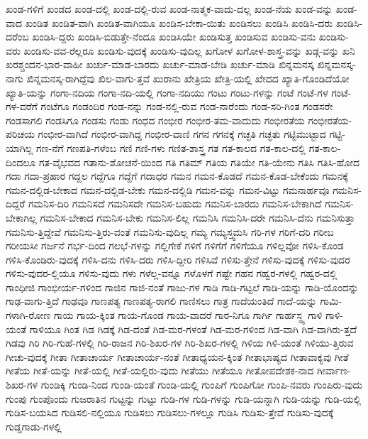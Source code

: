 {ಖಂಡ-ಗಳಿಗೆ
ಖಂಡದ
ಖಂಡ-ದಲ್ಲಿ
ಖಂಡ-ದಲ್ಲಿ-ರುವ
ಖಂಡ-ನಾತ್ಮಕ-ವಾದು-ದಲ್ಲ
ಖಂಡ-ನೆಯ
ಖಂಡ-ವನ್ನು
ಖಂಡ-ವಾದ
ಖಂಡಿತ
ಖಂಡಿತ-ವಾಗಿ
ಖಂಡಿತ-ವಾಗಿಯೂ
ಖಂಡಿಸ-ಬೇಕಾ-ಯಿತು
ಖಂಡಿಸಲು
ಖಂಡಿಸಿ
ಖಂಡಿಸಿ-ದರು
ಖಂಡಿಸಿ-ದರೆಂಬ
ಖಂಡಿಸಿ-ದ್ದರು
ಖಂಡಿಸಿ-ಬಿಡುತ್ತೇ-ನೆಂದೂ
ಖಂಡಿಸಿಯೇ
ಖಂಡಿಸುತ್ತ
ಖಂಡಿಸುವ
ಖಂಡಿಸು-ವನು
ಖಂಡಿಸು-ವರು
ಖಂಡಿಸು-ವವ-ರೆಲ್ಲರೂ
ಖಂಡಿಸು-ವುದಕ್ಕೆ
ಖಂಡಿಸು-ವುದಿಲ್ಲ
ಖಗೋಳ
ಖಗೋಳ-ಶಾಸ್ತ್ರ-ವನ್ನು
ಖಡ್ಗ-ವನ್ನು
ಖನಿ
ಖರಶ್ಚಂದನ-ಭಾರ-ವಾಹೀ
ಖರ್ಚು-ಮಾಡ-ಬಾರದು
ಖರ್ಚು-ಮಾಡ-ಬೇಡಿ
ಖರ್ಚು-ಮಾಡಿ
ಖಿನ್ನಮನಸ್ಕ
ಖಿನ್ನಮನಸ್ಕ-ನಾಗು
ಖಿನ್ನಮನಸ್ಕ-ರಾಗಿದ್ದೆವು
ಖಿಲ-ವಾಗು-ತ್ತವೆ
ಖುರಾನು
ಖೇತ್ರಿಯ
ಖೇತ್ರಿ-ಯಲ್ಲಿ
ಖೇದದ
ಖ್ಯಾತಿ-ಗೊಂಡಿದೆಯೋ
ಖ್ಯಾತಿ-ಯನ್ನು
ಗಂಗಾ-ನದಿಯ
ಗಂಗಾ-ನದಿ-ಯಲ್ಲಿ
ಗಂಗಾ-ನದಿಯು
ಗಂಟು
ಗಂಟು-ಗಳನ್ನು
ಗಂಟೆ
ಗಂಟೆ-ಗಳ
ಗಂಟೆ-ಗಳ-ವರೆಗೆ
ಗಂಟೆಗೂ
ಗಂಡಂದಿರ
ಗಂಡ-ನನ್ನು
ಗಂಡ-ನಲ್ಲಿ-ರುವ
ಗಂಡ-ನಾರೆಂದು
ಗಂಡ-ಸರಿ-ಗಿಂತ
ಗಂಡಸರೇ
ಗಂಡಸಾಗಲಿ
ಗಂಡಸಿಗೂ
ಗಂಡಸು
ಗಂಡು
ಗಂಧದ
ಗಂಭೀರ
ಗಂಭೀರ-ತಮ-ವಾದುದು
ಗಂಭೀರತೆಯ
ಗಂಭೀರತೆಯ-ಪರಿಚಯ
ಗಂಭೀರ-ವಾಗಿದೆ
ಗಂಭೀರ-ವಾಗಿದ್ದ
ಗಂಭೀರ-ವಾಣಿ
ಗಗನ
ಗಗನಕ್ಕೆ
ಗಚ್ಛತಿ
ಗಚ್ಛತು
ಗಟ್ಟಿಮುಟ್ಟಾದ
ಗಟ್ಟಿ-ಯಾಗಿಲ್ಲ
ಗಣ-ನೆಗೆ
ಗಣಪತಿ-ಗಳೆಂಬ
ಗಣಿ
ಗಣಿ-ಗಳು
ಗಣಿತ-ಶಾಸ್ತ್ರ
ಗತ
ಗತ-ಕಾಲದ
ಗತ-ಕಾಲ-ದಲ್ಲಿ
ಗತ-ಕಾಲ-ದಿಂದಲೂ
ಗತ-ವೈಭವದ
ಗತಾನು-ಶೋಚನೆ-ಯಿಂದ
ಗತಿ
ಗತಿಮ್
ಗತಿಯ
ಗತಿಯೇ
ಗತಿ-ಯೇನು
ಗತಿಸಿ
ಗತಿಸಿ-ಹೋದ
ಗದಾ
ಗದಾ-ಪ್ರಹಾರ
ಗದ್ದಲ
ಗದ್ದೆಗೂ
ಗದ್ದೆಗೆ
ಗದಾಧರ
ಗಮನ
ಗಮನ-ಕೊಡದೆ
ಗಮನ-ಕೊಡ-ಬೇಕೆಂದು
ಗಮನಕ್ಕೆ
ಗಮನ-ದಲ್ಲಿಡ-ಬೇಕಾದ
ಗಮನ-ದಲ್ಲಿಡ-ಬೇಕು
ಗಮನ-ದಲ್ಲಿಡಿ
ಗಮನ-ವನ್ನು
ಗಮನ-ವಿಟ್ಟು
ಗಮನಾರ್ಹವೂ
ಗಮನಿಸ-ದಿದ್ದರೆ
ಗಮನಿಸ-ದಿರಿ
ಗಮನಿಸದೆ
ಗಮನಿಸದೇ
ಗಮನಿಸ-ಬಹುದು
ಗಮನಿಸ-ಬಾರದು
ಗಮನಿಸ-ಬೇಕಾಗಿದೆ
ಗಮನಿಸ-ಬೇಕಾಗಿಲ್ಲ
ಗಮನಿಸ-ಬೇಕಾದ
ಗಮನಿಸ-ಬೇಕು
ಗಮನಿಸ-ಲಿಲ್ಲ
ಗಮನಿಸಿ
ಗಮನಿಸಿ-ದರೇ
ಗಮನಿಸಿ-ದೆನು
ಗಮನಿಸುತ್ತಾ
ಗಮನಿಸು-ತ್ತಿದ್ದೇವೆ
ಗಮನಿಸು-ತ್ತಿರು-ವಂತೆ
ಗಮನಿಸು-ವುದಿಲ್ಲ
ಗಮ್ಯ
ಗಮ್ಯಸ್ತ್ವಮಸಿ
ಗರಿ-ಗಳ
ಗರಿಗೆ-ದರಿ
ಗರೀಬ
ಗರೀಯಸೀ
ಗರ್ಜನೆ
ಗರ್ಭ-ದಿಂದ
ಗಲಭೆ-ಗಳನ್ನು
ಗಲ್ಲಿಗೇಕೆ
ಗಳಿಗೆ
ಗಳಿಗೆಗೆ
ಗಳಿಗೆಯೂ
ಗಳಿಲ್ಲವೋ
ಗಳಿಸಿ-ಕೊಂಡ
ಗಳಿಸಿ-ಕೊಂಡಿರು-ವುದಕ್ಕೆ
ಗಳಿಸಿ-ದನು
ಗಳಿಸಿ-ದರು
ಗಳಿಸಿ-ದ್ದೀರಿ
ಗಳಿಸಿವೆ
ಗಳಿಸು-ತ್ತೇನೆ
ಗಳಿಸು-ವುದಕ್ಕೆ
ಗಳಿಸು-ವುದರ
ಗಳಿಸು-ವುದರ-ಲ್ಲಿಯೂ
ಗಳಿಸು-ವುದು
ಗಳು
ಗಳೆಲ್ಲ-ವನ್ನೂ
ಗಳೊಳಗೆ
ಗಷ್ಟೇ
ಗಹನ
ಗಹ್ವರ-ಗಳಲ್ಲಿ
ಗಹ್ವರ-ದಲ್ಲಿ
ಗಾಂಧೀಜಿ
ಗಾಂಭೀರ್ಯ-ಗಳಿಂದ
ಗಾಜಿನ
ಗಾಜಿ-ನಂತೆ
ಗಾಜು-ಗಳ
ಗಾಡಿ
ಗಾಡಿ-ಗಟ್ಟಲೆ
ಗಾಡಿ-ಯನ್ನು
ಗಾಡಿ-ಯೊಂದನ್ನು
ಗಾಢ-ವಾಗು-ತ್ತಿದೆ
ಗಾಢವೂ
ಗಾಣಪತ್ಯ
ಗಾಣಪತ್ಯ-ರಾಗಲಿ
ಗಾಣಿಸಲು
ಗಾತ್ರ
ಗಾದೆಯಂತಿದೆ
ಗಾದೆ-ಯನ್ನು
ಗಾಮಿ-ಗಳಾಗಿ-ರೋಣ
ಗಾಯ
ಗಾಯ-ಕ್ಕಿಂತ
ಗಾಯ-ಗೊಂಡ
ಗಾಯ-ವಾದರೆ
ಗಾರ-ನಿಗೂ
ಗಾರ್ಗಿ
ಗಾರ್ಹಸ್ಥ್ಯ
ಗಾಳಿ
ಗಾಳಿ-ಯಂತೆ
ಗಾಳಿಯೂ
ಗಿಂತ
ಗಿಡ
ಗಿಡಕ್ಕೆ
ಗಿಡ-ದಂತೆ
ಗಿಡ-ಮರ-ಗಳಂತೆ
ಗಿಡ-ಮರ-ಗಳಿಂದ
ಗಿಡ-ವಾಗಿ
ಗಿಡ-ವಾಗಿರು-ತ್ತದೆ
ಗಿಡವು
ಗಿರಿ
ಗಿರಿ-ಗುಹೆ-ಗಳಲ್ಲಿ
ಗಿರಿ-ರಾಜನ
ಗಿರಿ-ಶಿಖರ-ಗಳ
ಗಿರಿ-ಶಿಖರ-ಗಳಲ್ಲಿ
ಗಿಳಿಯ
ಗಿಳಿ-ಯಂತೆ
ಗಿಳಿಯು-ತ್ತಿರುವ
ಗೀಚು-ವುದಕ್ಕೆ
ಗೀತಾ
ಗೀತಾಚಾರ್ಯ
ಗೀತಾಚಾರ್ಯ-ನಂತೆ
ಗೀತಾಧ್ಯಯನ-ಕ್ಕಿಂತ
ಗೀತಾಭಾಷ್ಯದ
ಗೀತಾವಾಕ್ಯವು
ಗೀತೆ
ಗೀತೆಯ
ಗೀತೆ-ಯನ್ನು
ಗೀತೆ-ಯಲ್ಲಿ
ಗೀತೆ-ಯಲ್ಲಿರು-ವುದು
ಗೀತೆಯು
ಗೀತೆಯೂ
ಗೀತೋಪದೇಶಕ-ನಾದ
ಗೀರ್ವಾಣ-ಶಿಖರ-ಗಳ
ಗುಂಡಿಕ್ಕಿ
ಗುಂಡಿ-ನಿಂದ
ಗುಂಡಿ-ಯಂತೆ
ಗುಂಡಿ-ಯಲ್ಲಿ
ಗುಂಪಿಗೆ
ಗುಂಪಿಗೋ
ಗುಂಪಿ-ನವರು
ಗುಂಪಿರು-ವುದು
ಗುಂಪು
ಗುಂಪೊಂದು
ಗುಜರಾತಿನ
ಗುಟ್ಟನ್ನು
ಗುಟ್ಟು
ಗುಡಿ-ಗಳ
ಗುಡಿ-ಗಳನ್ನು
ಗುಡಿ-ಯನ್ನಾಗಿ
ಗುಡಿ-ಯನ್ನು
ಗುಡಿ-ಯಲ್ಲಿ
ಗುಡಿಸ-ಬಯಸಿದ
ಗುಡಿಸಲಿ-ನಲ್ಲಿಯೂ
ಗುಡಿಸಲು
ಗುಡಿಸಲು-ಗಳಲ್ಲೂ
ಗುಡಿಸಿ
ಗುಡಿಸು-ತ್ತೇವೆ
ಗುಡಿಸು-ವುದಕ್ಕೆ
ಗುಡ್ಡಗಾಡು-ಗಳಲ್ಲಿ
}
